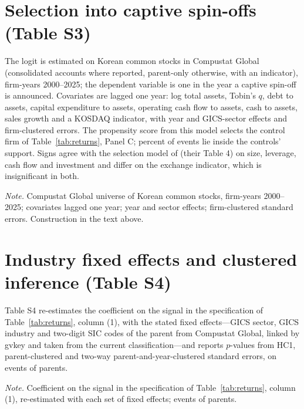 \documentclass[12pt]{article}
\newcommand{\tabnote}[1]{\par\vspace{4pt}\begin{minipage}{\linewidth}\singlespacing\small\emph{Note.} #1\end{minipage}}
\newcommand{\captive}{captive spin-off}
\begin{document}
\section{Selection into captive spin-offs (Table S3)}
The logit is estimated on Korean common stocks in Compustat Global (consolidated accounts where reported, parent-only otherwise, with an indicator), firm-years 2000--2025; the dependent variable is one in the year a \captive{} is announced. Covariates are lagged one year: log total assets, Tobin's $q$, debt to assets, capital expenditure to assets, operating cash flow to assets, cash to assets, sales growth and a KOSDAQ indicator, with year and GICS-sector effects and firm-clustered errors. The propensity score from this model selects the control firm of Table~\ref{tab:returns}, Panel C; \SelSupport{} percent of events lie inside the controls' support. Signs agree with the selection model of  (their Table 4) on size, leverage, cash flow and investment and differ on the exchange indicator, which is insignificant in both.
\begin{table}[htbp]\centering\caption{Firm-year logit of the captive spin-off decision}\label{tab:s_selection}
{\footnotesize\setlength{\tabcolsep}{3pt}}\tabnote{Compustat Global universe of Korean common stocks, firm-years 2000--2025; covariates lagged one year; year and sector effects; firm-clustered standard errors. Construction in the text above.}\end{table}

\section{Industry fixed effects and clustered inference (Table S4)}
Table S4 re-estimates the coefficient on the signal in the specification of Table~\ref{tab:returns}, column (1), with the stated fixed effects---GICS sector, GICS industry and two-digit SIC codes of the parent from Compustat Global, linked by gvkey and taken from the current classification---and reports $p$-values from HC1, parent-clustered and two-way parent-and-year-clustered standard errors, on \IndustryEvents{} events of \IndustryParents{} parents.
\begin{table}[htbp]\centering\caption{Returns on the signal with alternative fixed effects and clustering}\label{tab:s_industry}
{\footnotesize\setlength{\tabcolsep}{3pt}}\tabnote{Coefficient on the signal in the specification of Table~\ref{tab:returns}, column (1), re-estimated with each set of fixed effects; \IndustryEvents{} events of \IndustryParents{} parents.}\end{table}
\end{document}
